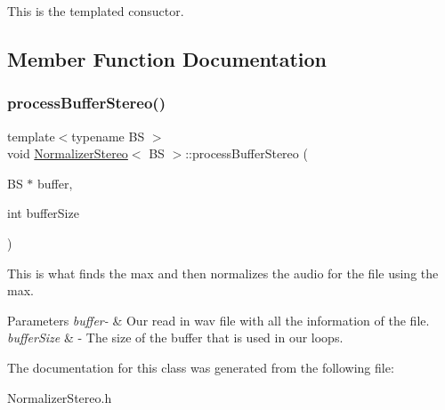 This is the templated consuctor. 

\subsection{Member Function Documentation}
\mbox{\label{classNormalizerStereo_af6fb357ed8edaa88898280e1734d933e}} 
\subsubsection{\texorpdfstring{process\+Buffer\+Stereo()}{processBufferStereo()}}
{\footnotesize\ttfamily template$<$typename BS $>$ \\
void \hyperlink{classNormalizerStereo}{Normalizer\+Stereo}$<$ BS $>$\+::process\+Buffer\+Stereo (\begin{DoxyParamCaption}\item[{BS $\ast$}]{buffer,  }\item[{int}]{buffer\+Size }\end{DoxyParamCaption})}

This is what finds the max and then normalizes the audio for the file using the max. 
\begin{DoxyParams}{Parameters}
{\em buffer-\/} & Our read in wav file with all the information of the file. \\
\hline
{\em buffer\+Size} & -\/ The size of the buffer that is used in our loops. \\
\hline
\end{DoxyParams}


The documentation for this class was generated from the following file\+:\begin{DoxyCompactItemize}
\item 
Normalizer\+Stereo.\+h\end{DoxyCompactItemize}
